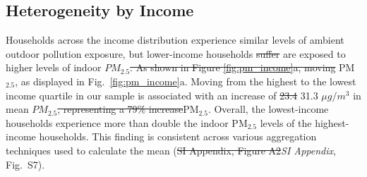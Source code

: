 \documentclass[reqno,12pt,notitlepage]{article}
\providecommand{\DIFadd}[1]{{\protect\color{BLUE}#1}} %
\providecommand{\DIFdel}[1]{{\protect\color{red}\sout{#1}}} %
\providecommand{\DIFaddbegin}{} %
\providecommand{\DIFaddend}{} %
\providecommand{\DIFdelbegin}{} %
\providecommand{\DIFdelend}{} %
\begin{document}
\subsection{Heterogeneity by Income}

Households across the income distribution experience similar levels of ambient outdoor pollution exposure, but lower-income households \DIFdelbegin \DIFdel{suffer }\DIFdelend \DIFaddbegin \DIFadd{are exposed to }\DIFaddend higher levels of indoor \DIFdelbegin \DIFdel{$PM_{2.5}$. As shown in Figure \ref{fig:pm_income}a, moving }\DIFdelend \DIFaddbegin \DIFadd{PM$_{2.5}$, as displayed in Fig.\ \ref{fig:pm_income}a. Moving }\DIFaddend from the highest to the lowest income quartile in our sample is associated with an increase of \DIFdelbegin \DIFdel{23.4 }\DIFdelend \DIFaddbegin \DIFadd{31.3 }\DIFaddend $\mu g/m^3$ in mean \DIFdelbegin \DIFdel{$PM_{2.5}$, representing a 79\% increase}\DIFdelend \DIFaddbegin \DIFadd{PM$_{2.5}$. Overall, the lowest-income households experience more than double the indoor PM$_{2.5}$ levels of the highest-income households}\DIFaddend . This finding is consistent across various aggregation techniques used to calculate the mean (\DIFdelbegin \DIFdel{SI Appendix, Figure A2}\DIFdelend \DIFaddbegin \DIFadd{\textit{SI Appendix}, Fig.\ S7}\DIFaddend ).
\end{document}
